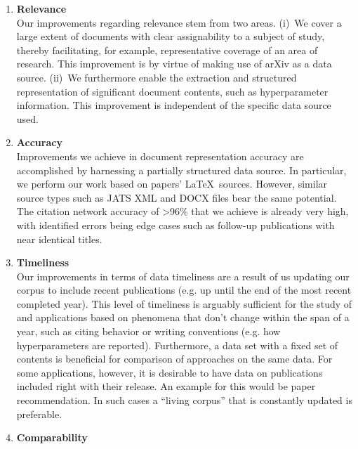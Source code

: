 \begin{enumerate}
\item \textbf{Relevance}\\
Our improvements regarding relevance stem from two areas. (i)~We cover a large extent of documents with clear assignability to a subject of study, thereby facilitating, for example, representative coverage of an area of research. This improvement is by virtue of making use of arXiv as a data source. (ii)~We furthermore enable the extraction and structured representation of significant document contents, such as hyperparameter information. This improvement is independent of the specific data source used.
\item \textbf{Accuracy}\\
Improvements we achieve in document representation accuracy are accomplished by harnessing a partially structured data source. In particular, we perform our work based on papers' \LaTeX\ sources. However, similar source types such as JATS XML and DOCX files bear the same potential. %
The citation network accuracy of >96\% that we achieve is already very high, with identified errors being edge cases such as follow-up publications with near identical titles. %
\item \textbf{Timeliness}\\
Our improvements in terms of data timeliness are a result of us updating our corpus to include recent publications (e.g. up until the end of the most recent completed year). This level of timeliness is arguably sufficient for the study of and applications based on phenomena that don't change within the span of a year, such as citing behavior or writing conventions (e.g. how hyperparameters are reported). Furthermore, a data set with a fixed set of contents is beneficial for comparison of approaches on the same data. For some applications, however, it is desirable to have data on publications included right with their release. An example for this would be paper recommendation. In such cases a ``living corpus'' that is constantly updated is preferable. %
\item \textbf{Comparability}\\

\end{enumerate}

